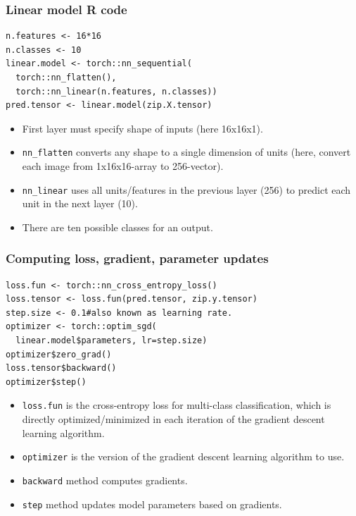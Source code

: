 \documentclass{beamer}
\begin{document}
\begin{frame}[fragile]
  \frametitle{Linear model R code}

\begin{verbatim}
n.features <- 16*16
n.classes <- 10
linear.model <- torch::nn_sequential(
  torch::nn_flatten(),
  torch::nn_linear(n.features, n.classes))
pred.tensor <- linear.model(zip.X.tensor)
\end{verbatim}

  \begin{itemize}
  \item First layer must specify shape of inputs (here 16x16x1).
  \item \texttt{nn\_flatten} converts any shape to a single dimension
    of units (here, convert each image from 1x16x16-array to 256-vector).
  \item \texttt{nn\_linear} uses all units/features in the previous
    layer (256) to predict each unit in the next layer (10).
  \item There are ten possible classes for an output.
  \end{itemize}

\end{frame}

\begin{frame}[fragile]
\frametitle{Computing loss, gradient, parameter updates}
\begin{verbatim}
loss.fun <- torch::nn_cross_entropy_loss()
loss.tensor <- loss.fun(pred.tensor, zip.y.tensor)
step.size <- 0.1#also known as learning rate.
optimizer <- torch::optim_sgd(
  linear.model$parameters, lr=step.size)
optimizer$zero_grad()
loss.tensor$backward()
optimizer$step()
\end{verbatim}
\begin{itemize}
\item \texttt{loss.fun} is the cross-entropy loss for multi-class
  classification, which is directly optimized/minimized in each
  iteration of the gradient descent learning algorithm.
\item \texttt{optimizer} is the version of the gradient descent learning
  algorithm to use.
\item \texttt{backward} method computes gradients.
\item \texttt{step} method updates model parameters based on gradients.
\end{itemize}
\end{frame}
\end{document}
